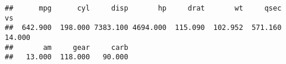 \documentclass[
]{book}
\newenvironment{Shaded}{\begin{snugshade}}{\end{snugshade}}
\newcommand{\CommentTok}[1]{\textcolor[rgb]{0.56,0.35,0.01}{\textit{#1}}}
\newcommand{\FunctionTok}[1]{\textcolor[rgb]{0.00,0.00,0.00}{#1}}
\newcommand{\NormalTok}[1]{#1}
\newcommand{\SpecialCharTok}[1]{\textcolor[rgb]{0.00,0.00,0.00}{#1}}
\begin{document}
\begin{verbatim}
##      mpg      cyl     disp       hp     drat       wt     qsec       vs 
##  642.900  198.000 7383.100 4694.000  115.090  102.952  571.160   14.000 
##       am     gear     carb 
##   13.000  118.000   90.000
\end{verbatim}

\begin{Shaded}
\end{Shaded}
\end{document}

